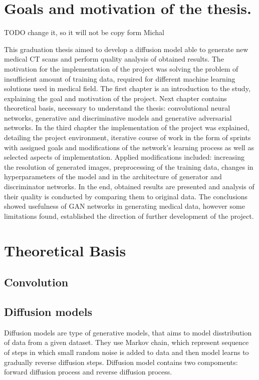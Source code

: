 \documentclass[11pt,a4paper]{report}
\begin{document}
\thispagestyle{empty}

\newpage

\tableofcontents
\chapter{Goals and motivation of the thesis.}
TODO change it, so it will not be copy form Michal

This graduation thesis aimed to develop a diffusion model able to generate new medical CT scans and perform quality analysis of obtained results. The motivation for the implementation of the project was solving the problem of insufficient amount of training data, required for different machine learning solutions used in medical field. The first chapter is an introduction to the study, explaining the goal and motivation of the project. Next chapter contains theoretical basis, necessary to understand the thesis: convolutional neural networks, generative and discriminative models and generative adversarial networks. In the third chapter the implementation of the project was explained, detailing the project environment, iterative course of work in the form of sprints with assigned goals and modifications of the network’s learning process as well as selected aspects of implementation. Applied modifications included: increasing the resolution of generated images, preprocessing of the training data, changes in hyperparameters of the model and in the architecture of generator and discriminator networks. In the end, obtained results are presented and analysis of their quality is conducted by comparing them to original data. The conclusions showed usefulness of GAN networks in generating medical data, however some limitations found, established the direction of further development of the project.

\chapter{Theoretical Basis}

\section{Convolution}
\section{Diffusion models}
Diffusion models are type of generative models, that aims to model disstribution of data from a given dataset. They use Markov chain, which represent sequence of steps in which small random noise is added to data and then model learns to gradually reverse diffusion steps. Diffusion model contains two compoments: forward diffusion process and reverse diffusion process.
\end{document}
